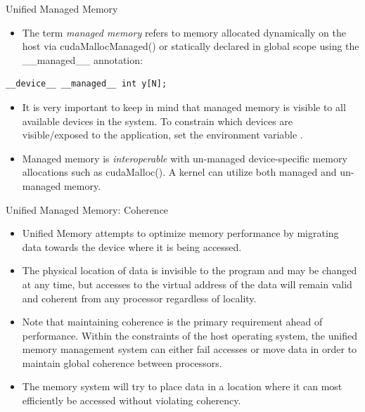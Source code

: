 \documentclass{beamer}
\begin{document}
\begin{frame}[fragile]{Unified Managed Memory}
\begin{itemize}
    \item<1->The term \emph{managed memory} refers to memory allocated dynamically on the host via {\selectfont cudaMallocManaged()} or statically declared in global scope using the {\selectfont \_\_managed\_\_} annotation:
    \end{itemize}
\begin{lstlisting}[]
  __device__ __managed__ int y[N];
\end{lstlisting}

\begin{itemize}
    \item<1->It is very important to keep in mind that managed memory is visible to all available devices in the system.  To constrain which devices are visible/exposed to the application, set the environment variable \href{http://docs.nvidia.com/cuda/cuda-c-programming-guide/index.html\#env-vars}{}.
    \item<1->Managed memory is \emph{interoperable} with un-managed device-specific memory allocations such as {\selectfont cudaMalloc()}.  A kernel can utilize both managed and un-managed memory.
\end{itemize}
\end{frame}

\begin{frame}{Unified Managed Memory: Coherence}
\begin{itemize}
    \item<1->Unified Memory attempts to optimize memory performance by migrating data towards the device where it is being accessed.
    \item<1->The physical location of data is invisible to the program and may be changed at any time, but accesses to the virtual address of the data will remain valid and coherent from any processor regardless of locality.
    \item<1->Note that maintaining coherence is the primary requirement ahead of performance.  Within the constraints of the host operating system, the unified memory management system can either fail accesses or move data in order to maintain global coherence between processors.
    \item<1->The memory system will try to place data in a location where it can most efficiently be accessed without violating coherency.
\end{itemize}
\end{frame}
\end{document}

